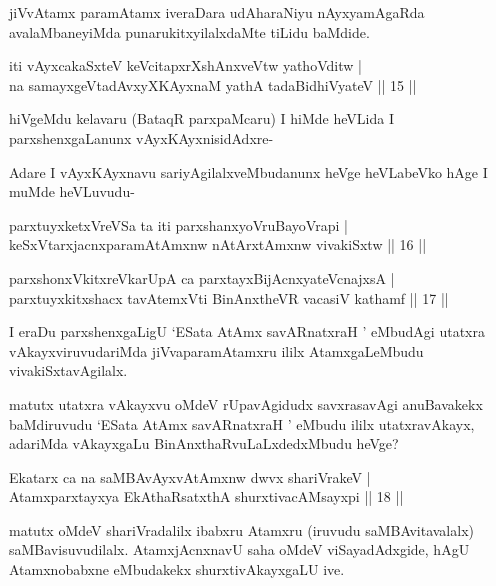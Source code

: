 \begin{artha}
jiVvAtamx paramAtamx iveraDara udAharaNiyu nAyxyamAgaRda avalaMbaneyiMda punarukitxyilalxdaMte tiLidu baMdide.
\end{artha}


\begin{shl}
iti vAyxcakaSxteV keVcitapxrXshAnxveVtw yathoVditw |\\
na samayxgeVtadAvxyXKAyxnaM yathA tadaBidhiVyateV \hfill || 15 ||
\end{shl}

\begin{artha}
hiVgeMdu kelavaru (BataqR parxpaMcaru) I hiMde heVLida I parxshenxgaLanunx vAyxKAyxnisidAdxre-

Adare I vAyxKAyxnavu sariyAgilalxveMbudanunx heVge heVLabeVko hAge I muMde heVLuvudu-
\end{artha}

\begin{shl}
parxtuyxketxVreVSa ta iti parxshanxyoVruBayoVrapi |\\
keSxVtarxjacnxparamAtAmxnw nAtArx\s \s tAmxnw vivakiSxtw \hfill || 16 ||
\end{shl}

\begin{shl}
parxshonxVkitxreVkarUpA ca parxtayxBijAcnxyateV\s cnajxsA |\\
parxtuyxkitxshacx tavA\s \s temxVti BinAnxtheVR vacasiV kathamf \hfill || 17 ||
\end{shl}

\begin{artha}
I eraDu parxshenxgaLigU `ESata AtAmx savARnatxraH ' eMbudAgi utatxra vAkayxviruvudariMda jiVvaparamAtamxru ililx AtamxgaLeMbudu vivakiSxtavAgilalx.

matutx utatxra vAkayxvu oMdeV rUpavAgidudx savxrasavAgi anuBavakekx baMdiruvudu `ESata AtAmx savARnatxraH ' eMbudu ililx utatxravAkayx, adariMda vAkayxgaLu BinAnxthaRvuLaLxdedxMbudu heVge?
\end{artha}%

\begin{shl}
Ekatarx ca na saMBAvAyxvAtAmxnw dwvx shariVrakeV |\\
Atamxparxtayxya EkAthaRsatxthA shurxtivacAMsayxpi \hfill || 18 ||
\end{shl}

\begin{artha}
matutx oMdeV shariVradalilx ibabxru Atamxru (iruvudu saMBAvitavalalx) saMBavisuvudilalx. AtamxjAcnxnavU saha oMdeV viSayadAdxgide, hAgU Atamxnobabxne eMbudakekx shurxtivAkayxgaLU ive.
\end{artha}

